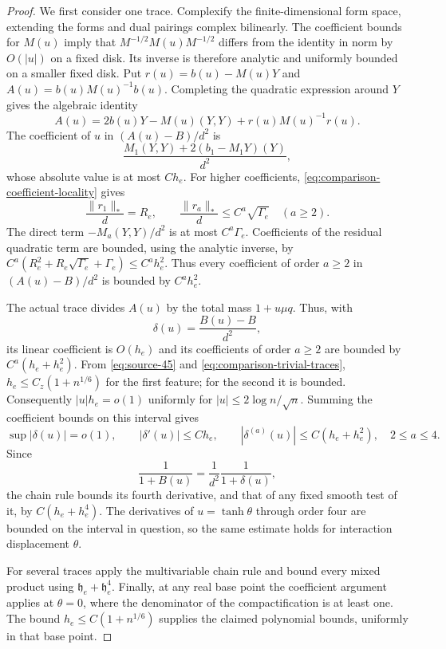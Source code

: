 \begin{proof}
We first consider one trace.  Complexify the finite-dimensional form space,
extending the forms and dual pairings complex bilinearly.
The coefficient bounds for $M(u)$ imply that
$M^{-1/2}M(u)M^{-1/2}$ differs from the identity in norm by $O(|u|)$ on a
fixed disk.  Its inverse is therefore analytic and uniformly bounded on a
smaller fixed disk.  Put $r(u)=b(u)-M(u)Y$ and
$A(u)=b(u)M(u)^{-1}b(u)$.  Completing the quadratic expression around $Y$
gives the algebraic identity
\[
 A(u)=2b(u)Y-M(u)(Y,Y)+r(u)M(u)^{-1}r(u).
\]
The coefficient of $u$ in $(A(u)-B)/d^2$ is
\[
 \frac{M_1(Y,Y)+2(b_1-M_1Y)(Y)}{d^2},
\]
whose absolute value is at most $Ch_e$.  For higher coefficients,
\eqref{eq:comparison-coefficient-locality} gives
\[
 \frac{\|r_1\|_*}{d}=R_e,\qquad
 \frac{\|r_a\|_*}{d}\le C^a\sqrt{\Gamma_e}\quad(a\ge2).
\]
The direct term $-M_a(Y,Y)/d^2$ is at most $C^a\Gamma_e$.  Coefficients of
the residual quadratic term are bounded, using the analytic inverse, by
$C^a(R_e^2+R_e\sqrt{\Gamma_e}+\Gamma_e)\le C^ah_e^2$.
Thus every coefficient of order $a\ge2$ in $(A(u)-B)/d^2$ is bounded by
$C^ah_e^2$.

The actual trace divides $A(u)$ by the total mass $1+u\mu q$.  Thus, with
\[
 \delta(u)=\frac{B(u)-B}{d^2},
\]
its linear coefficient is $O(h_e)$ and its coefficients of order $a\ge2$
are bounded by $C^a(h_e+h_e^2)$.  From
\eqref{eq:source-45} and \eqref{eq:comparison-trivial-traces},
$h_e\le C_z(1+n^{1/6})$ for the first feature; for the second it is bounded.
Consequently $|u|h_e=o(1)$ uniformly for $|u|\le2\log n/\sqrt n$.
Summing the coefficient bounds on this interval gives
\[
 \sup|\delta(u)|=o(1),\qquad
 |\delta'(u)|\le Ch_e,\qquad
 |\delta^{(a)}(u)|\le C(h_e+h_e^2),\quad 2\le a\le4.
\]
Since
\[
 \frac1{1+B(u)}=\frac1{d^2}\frac1{1+\delta(u)},
\]
the chain rule bounds its fourth derivative, and that of any fixed smooth
test of it, by $C(h_e+h_e^4)$.  The derivatives of $u=\tanh\theta$ through
order four are bounded on the interval in question, so the same estimate
holds for interaction displacement $\theta$.

For several traces apply the multivariable chain rule and bound every mixed
product using $\mathfrak h_e+\mathfrak h_e^4$.  Finally, at any real base
point the coefficient argument applies at $\theta=0$, where the denominator
of the compactification is at least one.  The bound
$h_e\le C(1+n^{1/6})$ supplies the claimed polynomial bounds, uniformly in
that base point.
\end{proof}

